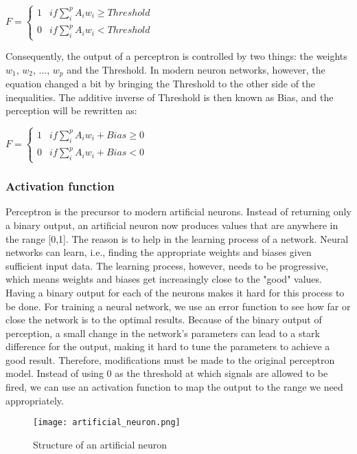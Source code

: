 \begin{center}
$F = \begin{cases}
1 & if \sum_{i}^{p} A_i w_i \geq Threshold \\
0 & if \sum_{i}^{p} A_i w_i < Threshold
\end{cases}$
\end{center}

Consequently, the output of a perceptron is controlled by two things: the weights $w_1$, $w_2$, ..., $w_p$ and the Threshold. 
In modern neuron networks, however, the equation changed a bit by bringing the Threshold to the other side of the inequalities. 
The additive inverse of Threshold is then known as Bias, and the perception will be rewritten as:

\begin{center}
$F = \begin{cases}
1 & if \sum_{i}^{p} A_i w_i + Bias \geq 0 \\
0 & if \sum_{i}^{p} A_i w_i + Bias < 0
\end{cases}$
\end{center}

\subsubsection{Activation function}

Perceptron is the precursor to modern artificial neurons. Instead of returning only a binary output, an artificial neuron now produces values that are anywhere in the range [0,1]. 
The reason is to help in the learning process of a network. Neural networks can learn, i.e., finding the appropriate weights and biases given sufficient input data. 
The learning process, however, needs to be progressive, which means weights and biases get increasingly close to the "good" values. 
Having a binary output for each of the neurons makes it hard for this process to be done. 
For training a neural network, we use an error function to see how far or close the network is to the optimal results.
Because of the binary output of perception, a small change in the network's parameters can lead to a stark difference for the output, making it hard to tune the parameters to achieve a good result. 
Therefore, modifications must be made to the original perceptron model. 
Instead of using 0 as the threshold at which signals are allowed to be fired, we can use an activation function to map the output to the range we need appropriately.

\begin{figure}[htbp!] 
\centering    
\texttt{[image: artificial\_neuron.png]}
\caption{Structure of an artificial neuron \cite{wikian}}
\label{fig:artificial-neuron}
\end{figure}

